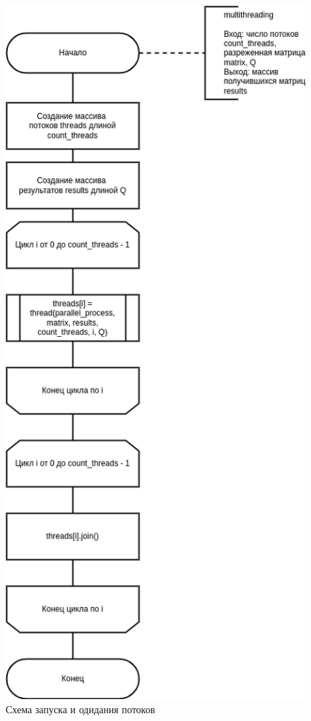 \begin{figure}[H]
	\begin{center}
		\includegraphics[scale=0.6]{img/multithreading.png}
	\end{center}
	\captionsetup{justification=centering}
	\caption{Схема запуска и одидания потоков}
	\label{img:multithreading}
\end{figure}

